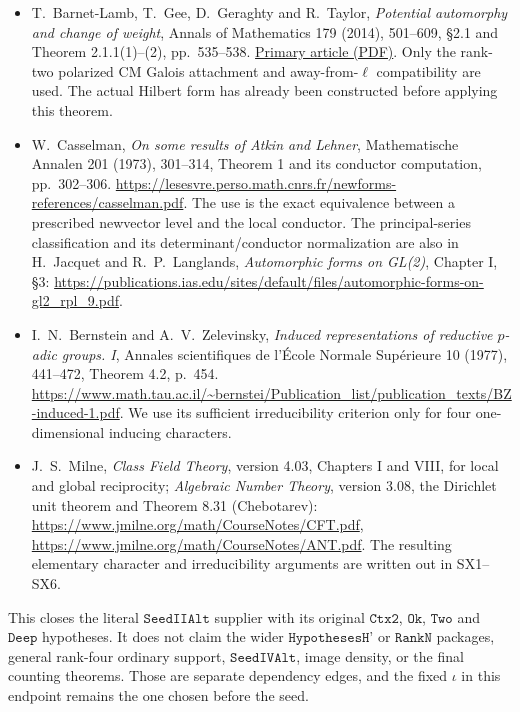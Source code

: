 \begin{itemize}
\item T.~Barnet-Lamb, T.~Gee, D.~Geraghty and R.~Taylor,
\emph{Potential automorphy and change of weight},
Annals of Mathematics 179 (2014), 501--609,
\S2.1 and Theorem 2.1.1(1)--(2), pp.~535--538.
\href{https://annals.math.princeton.edu/wp-content/uploads/annals-v179-n2-p03-p.pdf}{Primary article (PDF)}.
Only the rank-two polarized CM Galois attachment and
away-from-$\ell$ compatibility are used.  The actual Hilbert
form has already been constructed before applying this theorem.

\item W.~Casselman, \emph{On some results of Atkin and Lehner},
Mathematische Annalen 201 (1973), 301--314,
Theorem 1 and its conductor computation, pp.~302--306.
\url{https://lesesvre.perso.math.cnrs.fr/newforms-references/casselman.pdf}.
The use is the exact equivalence between a prescribed
newvector level and the local conductor.  The principal-series
classification and its determinant/conductor normalization are
also in H.~Jacquet and R.~P.~Langlands,
\emph{Automorphic forms on GL(2)}, Chapter I, \S3:
\url{https://publications.ias.edu/sites/default/files/automorphic-forms-on-gl2_rpl_9.pdf}.

\item I.~N.~Bernstein and A.~V.~Zelevinsky,
\emph{Induced representations of reductive $p$-adic groups. I},
Annales scientifiques de l'\'Ecole Normale Sup\'erieure 10
(1977), 441--472, Theorem 4.2, p.~454.
\url{https://www.math.tau.ac.il/~bernstei/Publication_list/publication_texts/BZ-induced-1.pdf}.
We use its sufficient irreducibility criterion only for
four one-dimensional inducing characters.

\item J.~S.~Milne, \emph{Class Field Theory}, version 4.03,
Chapters I and VIII, for local and global reciprocity;
\emph{Algebraic Number Theory}, version 3.08,
the Dirichlet unit theorem and Theorem 8.31 (Chebotarev):
\url{https://www.jmilne.org/math/CourseNotes/CFT.pdf},
\url{https://www.jmilne.org/math/CourseNotes/ANT.pdf}.
The resulting elementary character and irreducibility arguments
are written out in SX1--SX6.
\end{itemize}

This closes the literal $\texttt{SeedIIAlt}$ supplier with its
original $\texttt{Ctx2}$, $\texttt{Ok}$, $\texttt{Two}$ and
$\texttt{Deep}$ hypotheses.  It does not claim the wider
$\texttt{HypothesesH'}$ or $\texttt{RankN}$ packages, general
rank-four ordinary support, $\texttt{SeedIVAlt}$, image density,
or the final counting theorems.  Those are separate dependency
edges, and the fixed $\iota$ in this endpoint remains the one
chosen before the seed.
